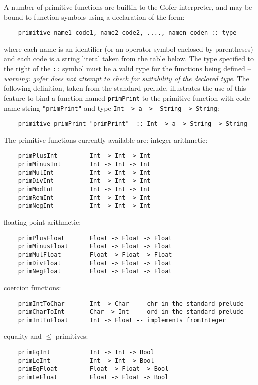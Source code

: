 A number of primitive functions are builtin to the  Gofer  interpreter,
and may be bound to function symbols using a declaration of the form:
\begin{verbatim}
    primitive name1 code1, name2 code2, ...., namen coden :: type
\end{verbatim}
where each name is an identifier (or an  operator  symbol  enclosed  by
parentheses) and each code is a string literal  taken  from  the  table
below.  The type specified to the right of the  \verb"::"  symbol  must  be  a
valid type for the functions being defined -- {\em warning: gofer  does  not
attempt to check for suitability of the declared type}.   The  following
definition, taken from the standard prelude,  illustrates  the  use  of
this feature to bind  a  function  named  \verb"primPrint"  to  the  primitive
function with code name string \verb="primPrint"= and type 
\verb"Int -> a ->  String -> String":
\begin{verbatim}
    primitive primPrint "primPrint"  :: Int -> a -> String -> String
\end{verbatim}
The primitive functions currently available are:
\BI
\IT integer arithmetic:
\begin{verbatim}
    primPlusInt         Int -> Int -> Int 
    primMinusInt        Int -> Int -> Int
    primMulInt          Int -> Int -> Int
    primDivInt          Int -> Int -> Int
    primModInt          Int -> Int -> Int
    primRemInt          Int -> Int -> Int
    primNegInt          Int -> Int -> Int
\end{verbatim}
\IT floating point arithmetic:
\begin{verbatim}
    primPlusFloat       Float -> Float -> Float
    primMinusFloat      Float -> Float -> Float
    primMulFloat        Float -> Float -> Float
    primDivFloat        Float -> Float -> Float
    primNegFloat        Float -> Float -> Float
\end{verbatim}
\newpage
\IT coercion functions:
\begin{verbatim}
    primIntToChar       Int -> Char  -- chr in the standard prelude
    primCharToInt       Char -> Int  -- ord in the standard prelude
    primIntToFloat      Int -> Float -- implements fromInteger
\end{verbatim}
\IT equality and $\le$ primitives:
\begin{verbatim}
    primEqInt           Int -> Int -> Bool
    primLeInt           Int -> Int -> Bool
    primEqFloat         Float -> Float -> Bool
    primLeFloat         Float -> Float -> Bool
\end{verbatim}

